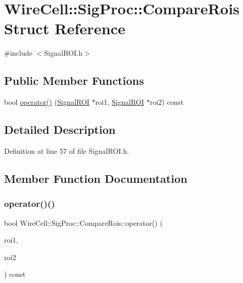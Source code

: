 \hypertarget{struct_wire_cell_1_1_sig_proc_1_1_compare_rois}{}\section{Wire\+Cell\+:\+:Sig\+Proc\+:\+:Compare\+Rois Struct Reference}
\label{struct_wire_cell_1_1_sig_proc_1_1_compare_rois}


{\ttfamily \#include $<$Signal\+R\+O\+I.\+h$>$}

\subsection*{Public Member Functions}
\begin{DoxyCompactItemize}
\item 
bool \hyperlink{struct_wire_cell_1_1_sig_proc_1_1_compare_rois_aa3d0d0dc9892646208da4a76ec1054c7}{operator()} (\hyperlink{class_wire_cell_1_1_sig_proc_1_1_signal_r_o_i}{Signal\+R\+OI} $\ast$roi1, \hyperlink{class_wire_cell_1_1_sig_proc_1_1_signal_r_o_i}{Signal\+R\+OI} $\ast$roi2) const
\end{DoxyCompactItemize}


\subsection{Detailed Description}


Definition at line 57 of file Signal\+R\+O\+I.\+h.



\subsection{Member Function Documentation}
\mbox{\label{struct_wire_cell_1_1_sig_proc_1_1_compare_rois_aa3d0d0dc9892646208da4a76ec1054c7}} 
\subsubsection{\texorpdfstring{operator()()}{operator()()}}
{\footnotesize\ttfamily bool Wire\+Cell\+::\+Sig\+Proc\+::\+Compare\+Rois\+::operator() (\begin{DoxyParamCaption}\item[{\hyperlink{class_wire_cell_1_1_sig_proc_1_1_signal_r_o_i}{Signal\+R\+OI} $\ast$}]{roi1,  }\item[{\hyperlink{class_wire_cell_1_1_sig_proc_1_1_signal_r_o_i}{Signal\+R\+OI} $\ast$}]{roi2 }\end{DoxyParamCaption}) const\hspace{0.3cm}{\ttfamily [inline]}}



